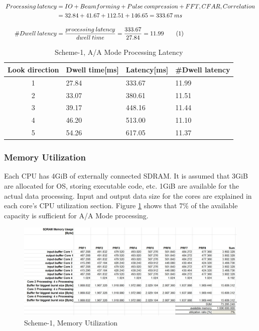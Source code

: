 \begin{align*}
	\label{aa:scheme1:latency}
		Processing \: latency &= IO + Beamforming + Pulse \: compression  + FFT,CFAR,Correlation \\
		&= 32.84 + 41.67 + 112.51 + 146.65 = 333.67 \: ms \\[0.3cm]
		\#Dwell \: latency &= \frac{processing \: latency}{dwell \: time} = \frac{333.67}{27.84} = 11.99 \stepcounter{equation}\tag{\theequation}
\end{align*}

\begin{table}[h!]
	\centering
	\begin{tabular}{|c|l|l|l|} 
	 \hline
	 \textbf{Look direction} & \textbf{Dwell time[ms]} & \textbf{Latency[ms]} & \textbf{\#Dwell latency} \\
	 \hline
	 1 & 27.84 & 333.67 & 11.99 \\ \hline
	 2 & 33.07 & 380.61 & 11.51 \\ \hline
	 3 & 39.17 & 448.16 & 11.44 \\ \hline
	 4 & 46.20 & 513.00 & 11.10 \\ \hline
	 5 & 54.26 & 617.05 & 11.37 \\ \hline
	\end{tabular}
	\caption{Scheme-1, A/A Mode Processing Latency}
	\label{tbl:existing_analysis:aa_scheme1_latency}
\end{table}

\subsubsection{Memory Utilization}
\label{sec:scheme1:mem_util}
Each CPU has 4GiB of externally connected SDRAM. It is assumed that 3GiB are allocated for OS, storing executable code, etc. 1GiB are available for the actual data processing. Input and output data size for the cores are explained in each core's CPU utilization section. Figure \ref{fig:existing_analysis:aa_scheme1_mem_util} shows that 7\% of the available capacity is sufficient for A/A Mode processing.

\begin{figure}[h!]
	\centering
	\includegraphics[width=160mm]{figures/aa_scheme1_mem_util}
	\caption{Scheme-1, Memory Utilization}
	\label{fig:existing_analysis:aa_scheme1_mem_util}
\end{figure}

